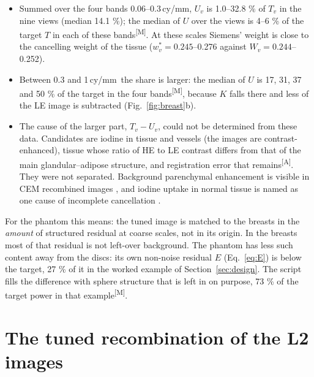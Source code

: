 \documentclass[11pt,a4paper]{article}
\newcommand{\ws}{w^{*}}
\newcommand{\M}{\textsuperscript{[M]}}
\newcommand{\As}{\textsuperscript{[A]}}
\newcommand{\cymm}{\,cy/mm}
\begin{document}
\begin{itemize}
\item Summed over the four bands 0.06--0.3\cymm, $U_v$ is 1.0--32.8 \% of $T_v$ in the nine views (median
14.1 \%); the median of $U$ over the views is 4--6 \% of the target $T$ in each of these bands\M. At these scales
Siemens' weight is close to the cancelling weight of the tissue ($\ws_v=0.245$--0.276 against
$W_v=0.244$--0.252).
\item Between 0.3 and 1\cymm\ the share is larger: the median of $U$ is 17, 31, 37 and 50 \% of the target in the
four bands\M, because $K$ falls there and less of the LE image is subtracted (Fig.~\ref{fig:breast}b).
\item The cause of the larger part, $T_v-U_v$, could not be determined from these data. Candidates are iodine in tissue
and vessels (the images are contrast-enhanced), tissue whose ratio of HE to LE contrast differs from that of the
main glandular--adipose structure, and registration error that remains\As. They were not separated. Background
parenchymal enhancement is visible in CEM recombined images \cite{sogani2017}, and iodine uptake in normal tissue
is named as one cause of incomplete cancellation \cite{hill2013b}.
\end{itemize}

For the phantom this means: the tuned image is matched to the breasts in the \emph{amount} of structured residual at
coarse scales, not in its origin. In the breasts most of that residual is not left-over background. The phantom has
less such content away from the discs: its own non-noise residual $E$ (Eq.~\ref{eq:E}) is below the target, 27 \% of
it in the worked example of Section~\ref{sec:design}. The script fills the difference with sphere structure that is
left in on purpose, 73 \% of the target power in that example\M.

\section{The tuned recombination of the L2 images}\label{sec:tuned}
\end{document}
